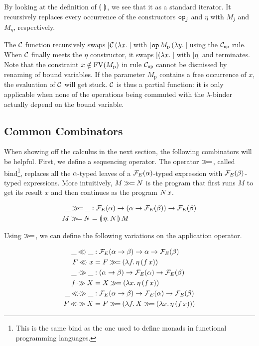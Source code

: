 \documentclass{llncs}
\begin{document}
By looking at the definition of $\llparenthesis \,  \, \rrparenthesis$, we see that it as a standard
iterator. It recursively replaces every occurrence of the constructors
$\mathtt{op}_j$ and $\eta$ with $M_j$ and $M_\eta$, respectively.

The $\mathcal{C}$ function recursively swaps [$\mathcal{C}\,(\lambda x.\,$] with
[$\mathtt{op}\,M_{\mathrm{p}}\,(\lambda y.\,$] using the $\mathcal{C}_{\mathtt{op}}$
rule. When $\mathcal{C}$ finally meets the $\eta$ constructor, it swaps
[$(\lam{x}$] with [$\eta$] and terminates. Note that the constraint $x
\notin \operatorname{FV}(M_{\mathrm{p}})$ in rule $\mathcal{C}_{\mathtt{op}}$ cannot be dismissed by
renaming of bound variables. If the parameter $M_{\mathrm{p}}$ contains a
free occurrence of $x$, the evaluation of $\mathcal{C}$ will get stuck. $\mathcal{C}$ is
thus a partial function: it is only applicable when none of the operations
being commuted with the $\lambda$-binder actually depend on the bound
variable.

\subsection{Common Combinators}
\label{ssec:common-combinators}

When showing off the calculus in the next section, the following
combinators will be helpful. First, we define a sequencing operator. The
operator $\mathbin{\gg\!=}$, called bind\footnote{This is the same bind as the one
  used to define monads in functional programming languages.}, replaces all
the $\alpha$-typed leaves of a $\mathcal{F}_E(\alpha)$-typed expression with
$\mathcal{F}_E(\beta)$-typed expressions. More intuitively, $M \mathbin{\gg\!=} N$ is the
program that first runs $M$ to get its result $x$ and then continues as the
program $N\,x$.

\begin{align*}
  \_ \hsbind \_ &: \FF_E(\alpha) \to (\alpha \to \FF_E(\beta)) \to \FF_E(\beta) \\
  M \hsbind N &= \ap{\banana{\onto{\eta}{N}}}{M}
\end{align*}

Using $\mathbin{\gg\!=}$, we can define the following variations on the application
operator.

\begin{align*}
  \_ \apl \_ &: \FF_E(\alpha \to \beta) \to \alpha \to \FF_E(\beta) \\
  F \apl x &= F \hsbind (\lam{f}{\ap{\eta}{(\ap{f}{x})}}) \\
  \_ \apr \_ &: (\alpha \to \beta) \to \FF_E(\alpha) \to \FF_E(\beta) \\
  f \apr X &= X \hsbind (\lam{x}{\ap{\eta}{(\ap{f}{x})}}) \\
  \_ \aplr \_ &: \FF_E(\alpha \to \beta) \to \FF_E(\alpha) \to \FF_E(\beta) \\
  F \aplr X &= F \hsbind (\lam{f}{X \hsbind (\lam{x}{\ap{\eta}{(\ap{f}{x})}})})
\end{align*}
\end{document}
